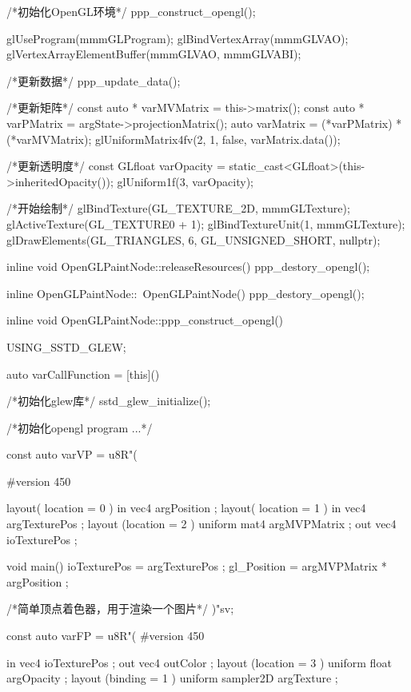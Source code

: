 \begin{thebookfilesourceone}[escapeinside={(*@}{@*)},
caption=GoodLuck,
title=\filesourcenumbernameone \thefilesourcenumber
]
{{        /*初始化OpenGL环境*/
        ppp_construct_opengl();

        glUseProgram(mmmGLProgram);
        glBindVertexArray(mmmGLVAO);
        glVertexArrayElementBuffer(mmmGLVAO, mmmGLVABI);

        /*更新数据*/
        ppp_update_data();

        /*更新矩阵*/
        const auto * varMVMatrix = this->matrix();
        const auto * varPMatrix = argState->projectionMatrix();
        auto varMatrix = (*varPMatrix) * (*varMVMatrix);
        glUniformMatrix4fv(2, 1, false, varMatrix.data());

        /*更新透明度*/
        const GLfloat varOpacity = static_cast<GLfloat>(this->inheritedOpacity());
        glUniform1f(3, varOpacity);

        /*开始绘制*/
        glBindTexture(GL_TEXTURE_2D, mmmGLTexture);
        glActiveTexture(GL_TEXTURE0 + 1);
        glBindTextureUnit(1, mmmGLTexture);
        glDrawElements(GL_TRIANGLES, 6, GL_UNSIGNED_SHORT, nullptr);

    }

    inline void OpenGLPaintNode::releaseResources() {
        ppp_destory_opengl();
    }

    inline OpenGLPaintNode::~OpenGLPaintNode() {
        ppp_destory_opengl();
    }

    inline void OpenGLPaintNode::ppp_construct_opengl() {
        USING_SSTD_GLEW;

        auto varCallFunction = [this]() {

            /*初始化glew库*/
            sstd_glew_initialize();

            /*初始化opengl program ...*/

            const auto varVP = u8R"(

#version 450

layout( location = 0 ) in vec4 argPosition       ;
layout( location = 1 ) in vec4 argTexturePos     ;
layout (location = 2 ) uniform mat4 argMVPMatrix ;
out vec4 ioTexturePos                            ;

void main(){
    ioTexturePos = argTexturePos                ;
    gl_Position =  argMVPMatrix * argPosition   ;
}

/*简单顶点着色器，用于渲染一个图片*/
)"sv;

            const auto varFP = u8R"(
#version 450

in vec4 ioTexturePos                               ;
out vec4 outColor                                  ;
layout (location = 3 ) uniform float argOpacity    ;
layout (binding = 1 ) uniform sampler2D argTexture ;

}}}
\end{thebookfilesourceone}
